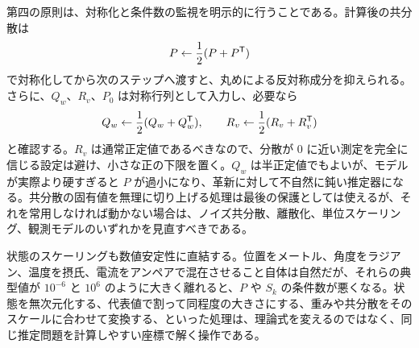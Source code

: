 第四の原則は、対称化と条件数の監視を明示的に行うことである。計算後の共分散は
\begin{equation}
  P\leftarrow\frac{1}{2}(P+P^{\mathsf{T}})
\end{equation}
で対称化してから次のステップへ渡すと、丸めによる反対称成分を抑えられる。さらに、$Q_w$、$R_v$、$P_0$ は対称行列として入力し、必要なら
\begin{equation}
  Q_w\leftarrow\frac{1}{2}(Q_w+Q_w^{\mathsf{T}}),
  \qquad
  R_v\leftarrow\frac{1}{2}(R_v+R_v^{\mathsf{T}})
\end{equation}
と確認する。$R_v$ は通常正定値であるべきなので、分散が 0 に近い測定を完全に信じる設定は避け、小さな正の下限を置く。$Q_w$ は半正定値でもよいが、モデルが実際より硬すぎると $P$ が過小になり、革新に対して不自然に鈍い推定器になる。共分散の固有値を無理に切り上げる処理は最後の保護としては使えるが、それを常用しなければ動かない場合は、ノイズ共分散、離散化、単位スケーリング、観測モデルのいずれかを見直すべきである。

状態のスケーリングも数値安定性に直結する。位置をメートル、角度をラジアン、温度を摂氏、電流をアンペアで混在させること自体は自然だが、それらの典型値が $10^{-6}$ と $10^6$ のように大きく離れると、$P$ や $S_k$ の条件数が悪くなる。状態を無次元化する、代表値で割って同程度の大きさにする、重みや共分散をそのスケールに合わせて変換する、といった処理は、理論式を変えるのではなく、同じ推定問題を計算しやすい座標で解く操作である。

